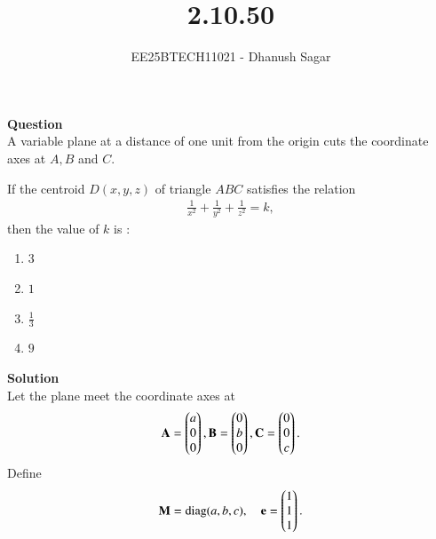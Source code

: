 \documentclass[journal]{IEEEtran}
\begin{document}



\title{2.10.50}
\author{EE25BTECH11021 - Dhanush Sagar
}
{\let\newpage\relax\maketitle}

\renewcommand{\thefigure}{\theenumi}
\renewcommand{\thetable}{\theenumi}
\setlength{\intextsep}{10pt} %


\renewcommand{\thetable}{\theenumi}


\textbf{Question} \\
 A variable plane at a distance of one unit from the origin cuts the coordinate axes at $A, B$ and $C$.  


If the centroid $D(x,y,z)$ of triangle $ABC$ satisfies the relation  
\begin{align*}
\frac{1}{x^{2}} + \frac{1}{y^{2}} + \frac{1}{z^{2}} = k,
\end{align*}
then the value of $k$ is :  

\begin{multicols}{2}
\begin{enumerate}
    \item $3$
    \item $1$
    \item $\tfrac{1}{3}$
    \item $9$
\end{enumerate}
\end{multicols}

\textbf{Solution} \\

Let the plane meet the coordinate axes at 
\begin{align*}
\mathbf{A} = \begin{pmatrix}a\\0\\0\end{pmatrix}, 
\mathbf{B} = \begin{pmatrix}0\\b\\0\end{pmatrix}, 
\mathbf{C} = \begin{pmatrix}0\\0\\c\end{pmatrix}.
\end{align*}
Define
\begin{align*}
    \mathbf{M} = \mathrm{diag}(a,b,c), 
\quad 
\mathbf{e} = \begin{pmatrix}1 \\ 1 \\ 1\end{pmatrix}.
\end{align*}
\end{document}
